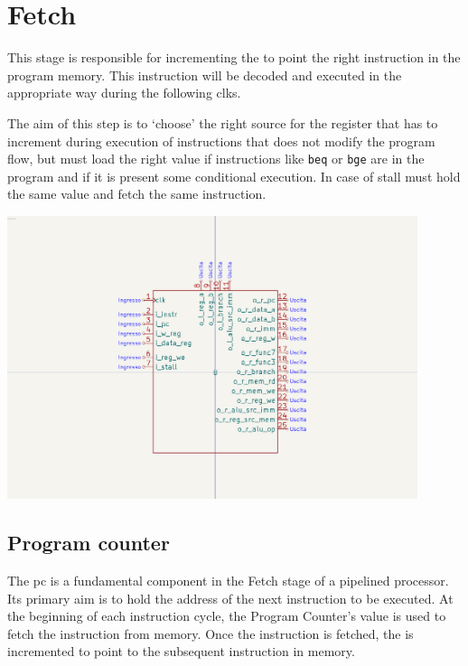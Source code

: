 \documentclass{article}
\begin{document}
\section{Fetch}
\begin{minipage}{0.48\textwidth}
This stage is responsible for incrementing the \PC to point the right instruction in the program memory.
This instruction will be decoded and executed in the appropriate way during the following \glspl{clk}. 

The aim of this step is to `choose' the right source for the \PC register that has to increment during execution of 
instructions that does not modify the program flow, but must load the right value if instructions 
like \texttt{beq} or \texttt{bge} are in the program and if it is present some conditional execution.
In case of \gls{stall} must hold the same value and fetch the same instruction.
\end{minipage}
\begin{minipage}{0.48\textwidth}
  \includegraphics[width=0.9\textwidth,right,trim={400 150 400 150},clip]{components/Decode.png}
\end{minipage}

\subsection{Program counter}\label{PC}

    The \acrfull{pc} is a fundamental component in the Fetch stage of a pipelined \RISCV processor. 
    Its primary aim is to hold the address of the next instruction to be executed. 
    At the beginning of each instruction cycle, the Program Counter's value is used to fetch the instruction from memory. 
    Once the instruction is fetched, the \PC is incremented to point to the subsequent instruction in memory.
    
\end{document}
